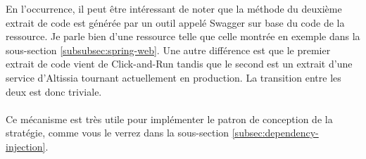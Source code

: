 En l'occurrence, il peut être intéressant de noter que la méthode du deuxième extrait de code est générée par un outil appelé Swagger sur base du code de la ressource.
Je parle bien d'une ressource telle que celle montrée en exemple dans la sous-section \ref{subsubsec:spring-web}.
Une autre différence est que le premier extrait de code vient de Click-and-Run tandis que le second est un extrait d'une service d'Altissia tournant actuellement en production.
La transition entre les deux est donc triviale.

\paragraph{}
Ce mécanisme est très utile pour implémenter le patron de conception de la stratégie, comme vous le verrez dans la sous-section \ref{subsec:dependency-injection}.
